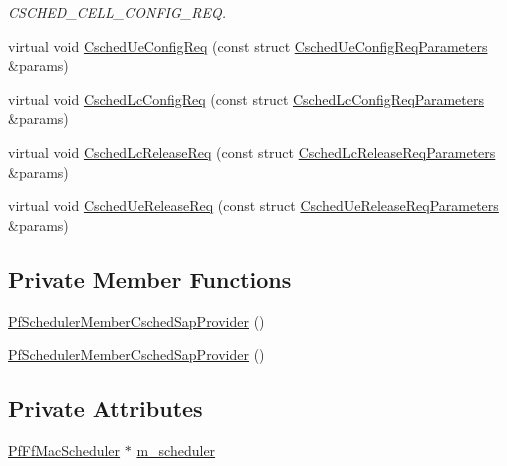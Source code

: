 \begin{DoxyCompactItemize}
\begin{DoxyCompactList}\small\item\em C\+S\+C\+H\+E\+D\+\_\+\+C\+E\+L\+L\+\_\+\+C\+O\+N\+F\+I\+G\+\_\+\+R\+EQ. \end{DoxyCompactList}\item 
virtual void \hyperlink{classns3_1_1PfSchedulerMemberCschedSapProvider_afebb4feac3ea12c684bfdbd896b7f4c7}{Csched\+Ue\+Config\+Req} (const struct \hyperlink{structns3_1_1FfMacCschedSapProvider_1_1CschedUeConfigReqParameters}{Csched\+Ue\+Config\+Req\+Parameters} \&params)
\item 
virtual void \hyperlink{classns3_1_1PfSchedulerMemberCschedSapProvider_a1510b83c7ede6424e3d260c232507f63}{Csched\+Lc\+Config\+Req} (const struct \hyperlink{structns3_1_1FfMacCschedSapProvider_1_1CschedLcConfigReqParameters}{Csched\+Lc\+Config\+Req\+Parameters} \&params)
\item 
virtual void \hyperlink{classns3_1_1PfSchedulerMemberCschedSapProvider_a9c7cd271a779dc3b139b12e55fe92f97}{Csched\+Lc\+Release\+Req} (const struct \hyperlink{structns3_1_1FfMacCschedSapProvider_1_1CschedLcReleaseReqParameters}{Csched\+Lc\+Release\+Req\+Parameters} \&params)
\item 
virtual void \hyperlink{classns3_1_1PfSchedulerMemberCschedSapProvider_a331ead24cb8401270ca03659bc91c830}{Csched\+Ue\+Release\+Req} (const struct \hyperlink{structns3_1_1FfMacCschedSapProvider_1_1CschedUeReleaseReqParameters}{Csched\+Ue\+Release\+Req\+Parameters} \&params)
\end{DoxyCompactItemize}
\subsection*{Private Member Functions}
\begin{DoxyCompactItemize}
\item 
\hyperlink{classns3_1_1PfSchedulerMemberCschedSapProvider_afe2df01e425a248df6abab05cd9d3a2c}{Pf\+Scheduler\+Member\+Csched\+Sap\+Provider} ()
\item 
\hyperlink{classns3_1_1PfSchedulerMemberCschedSapProvider_afe2df01e425a248df6abab05cd9d3a2c}{Pf\+Scheduler\+Member\+Csched\+Sap\+Provider} ()
\end{DoxyCompactItemize}
\subsection*{Private Attributes}
\begin{DoxyCompactItemize}
\item 
\hyperlink{classns3_1_1PfFfMacScheduler}{Pf\+Ff\+Mac\+Scheduler} $\ast$ \hyperlink{classns3_1_1PfSchedulerMemberCschedSapProvider_a35bbc07ecb266632f9125d4d35c89b85}{m\+\_\+scheduler}
\end{DoxyCompactItemize}


